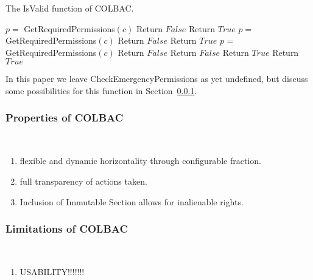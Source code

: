 \begin{algorithm}
\caption{The IsValid function of COLBAC.}
\label{alg:isvalid}
\begin{algorithmic}[1]
         
            \State $p =$ GetRequiredPermissions$(c)$
                \State Return $False$
            \EndIf
        \EndFor
        \State Return $True$
    \Else
        \State $p =$ GetRequiredPermissions$(c)$
            \State Return $False$
        \EndIf
        \State Return $True$
    \EndIf
{}
     
        \State $p$ = GetRequiredPermissions$(c)$
            \State Return $False$
                \State Return $False$
            \EndIf
            \State Return $True$
        \Else {}
            \State Return $True$
        \EndIf
    \EndFor
\EndIf
\EndProcedure
\end{algorithmic}
\end{algorithm}

In this paper we leave CheckEmergencyPermissions as yet undefined, but discuss
some possibilities for this function in Section~\ref{sec:colbacproperties}.

\subsubsection{Properties of COLBAC}
\label{sec:colbacproperties}
\mbox{}\\
\begin{enumerate}
\item flexible and dynamic horizontality through configurable fraction.
\item full transparency of actions taken.
\item Inclusion of Immutable Section allows for inalienable rights.
\end{enumerate}

\subsubsection{Limitations of COLBAC}
\mbox{}\\
\begin{enumerate}
\item USABILITY!!!!!!!
\end{enumerate}
